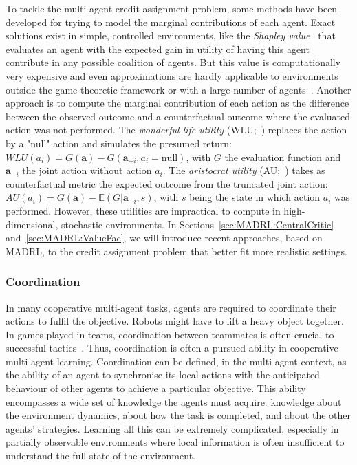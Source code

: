 To tackle the multi-agent credit assignment problem, some methods have been developed for trying to model the marginal contributions of each agent. Exact solutions exist in simple, controlled environments, like the \textit{Shapley value}~\citep{Shapley1953} that evaluates an agent with the expected gain in utility of having this agent contribute in any possible coalition of agents. But this value is computationally very expensive and even approximations are hardly applicable to environments outside the game-theoretic framework or with a large number of agents~\citep{Fatima2008_ShapleyLinApprox, Michalak2014_ShapleyEffComp, Wang2020_ShapleyQValue, Wang2022_SHAQ}. 
Another approach is to compute the marginal contribution of each action as the difference between the observed outcome and a counterfactual outcome where the evaluated action was not performed. The \textit{wonderful life utility} (WLU;~\cite{Wolpert1999_WLU}) replaces the action by a "null" action and simulates the presumed return: $WLU(a_i)=G(\mathbf{a})-G(\mathbf{a}_{-i},a_i=\text{null})$, with $G$ the evaluation function and $\mathbf{a}_{-i}$ the joint action without action $a_i$. The \textit{aristocrat utility} (AU;~\cite{Wolpert2002_AristoUtility}) takes as counterfactual metric the expected outcome from the truncated joint action: $AU(a_i)=G(\mathbf{a})-\mathbb{E}(G|\mathbf{a}_{-i},s)$, with $s$ being the state in which action $a_i$ was performed. However, these utilities are impractical to compute in high-dimensional, stochastic environments. In Sections~\ref{sec:MADRL:CentralCritic} and~\ref{sec:MADRL:ValueFac}, we will introduce recent approaches, based on MADRL, to the credit assignment problem that better fit more realistic settings. 


\subsubsection{Coordination}\label{sec:MAL:Coordination}

In many cooperative multi-agent tasks, agents are required to coordinate their actions to fulfil the objective. Robots might have to lift a heavy object together. In games played in teams, coordination between teammates is often crucial to successful tactics~\citep{Samvelyan2019_SMAC, Bard2020_Hanabi}. Thus, coordination is often a pursued ability in cooperative multi-agent learning. Coordination can be defined, in the multi-agent context, as the ability of an agent to synchronise its local actions with the anticipated behaviour of other agents to achieve a particular objective. This ability encompasses a wide set of knowledge the agents must acquire: knowledge about the environment dynamics, about how the task is completed, and about the other agents' strategies. Learning all this can be extremely complicated, especially in partially observable environments where local information is often insufficient to understand the full state of the environment. 

